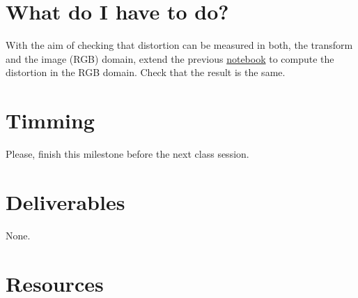 \section{What do I have to do?}
With the aim of checking that distortion can be measured in both, the
transform and the image (RGB) domain, extend the
previous \href{https://github.com/Sistemas-Multimedia/Sistemas-Multimedia.github.io/blob/master/milestones/07-DCT/block_DCT_compression.ipynb}{notebook}
to compute the distortion in the RGB domain. Check that the result is
the same.

\section{Timming}

Please, finish this milestone before the next class session.

\section{Deliverables}

None.

\section{Resources}

\renewcommand{\addcontentsline}[3]{}%

